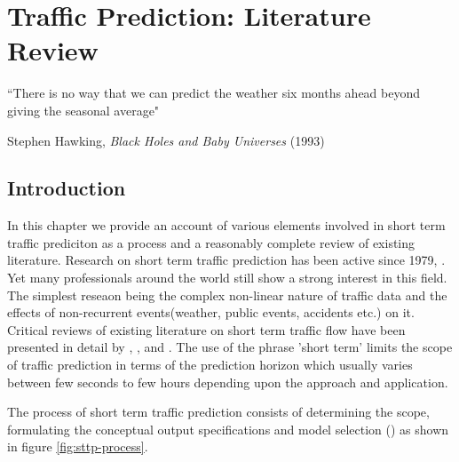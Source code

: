 
\chapter{Traffic Prediction: Literature Review}

\label{Chapter2}


{``There is no way that we can predict the weather six months ahead beyond giving the seasonal
average"}
\begin{flushright}
Stephen Hawking, \textit{Black Holes and Baby Universes} (1993)
\end{flushright}

\section{Introduction}
In this chapter we provide an account of various elements involved in short term traffic prediciton
as a process and a reasonably complete review of existing literature. Research on short term traffic
prediction has been active since 1979, \citet{ahmed1979analysis}. Yet many professionals around the
world still show a strong interest in this field.
The simplest reseaon being the complex non-linear nature of traffic data and the effects of
non-recurrent events(weather, public events, accidents etc.) on it.  Critical reviews of existing
literature on short term traffic flow have been presented in detail by \citet{smith1997traffic},
\citet{vlahogianni2004short}, \citet{van2012short} and \citet{vlahogianni2014short}. The use of
the phrase 'short term' limits the scope of traffic prediction in terms of the prediction horizon
which usually varies between few seconds to few hours depending upon the approach and application.

The process of short term traffic prediction consists of determining the scope, formulating the
conceptual output specifications and model selection (\citet{vlahogianni2004short}) as shown in
figure \ref{fig:sttp-process}.

